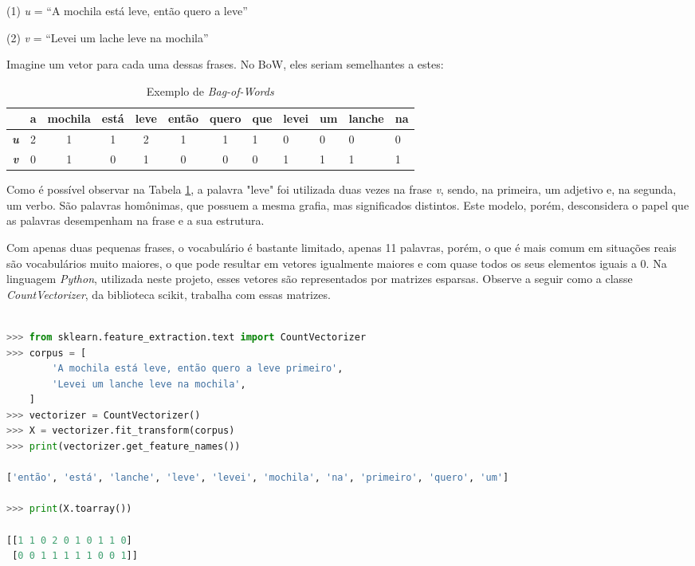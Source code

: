 \begin{samepage}
(1) \textit{u} =  “A mochila está leve, então quero a leve”

\nopagebreak

(2) \textit{v} = “Levei um lache leve na mochila”
\end{samepage}

Imagine um vetor para cada uma dessas frases. No BoW, eles seriam semelhantes a estes:

\begin{center}
\begin{table}[htbp]
\centering
\begin{tabular}{ccccccclllll}
\hline
 & \textbf{a} & \textbf{mochila} & \textbf{está} & \textbf{leve} & \textbf{então} & \textbf{quero} & \textbf{que} & \textbf{levei} & \textbf{um} & \textbf{lanche} & \textbf{na} \\ \hline
\textbf{\textit{u}} & 2 & 1 & 1 & 2 & 1 & 1 & 1 & 0 & 0 & 0 & 0 \\
\textbf{\textit{v}} & 0 & 1 & 0 & 1 & 0 & 0 & 0 & 1 & 1 & 1 & 1
\end{tabular}
\caption{Exemplo de \textit{Bag-of-Words}}
\label{bow}
\end{table}
\end{center}

Como é possível observar na Tabela \ref{bow}, a palavra "leve" foi utilizada duas vezes na frase \textit{v}, sendo, na primeira, um adjetivo e, na segunda, um verbo. São palavras homônimas, que possuem a mesma grafia, mas significados distintos. Este modelo, porém, desconsidera o papel que as palavras desempenham na frase e a sua estrutura.

Com apenas duas pequenas frases, o vocabulário é bastante limitado, apenas 11 palavras, porém, o que é mais comum em situações reais são vocabulários muito maiores, o que pode resultar em vetores igualmente maiores e com quase todos os seus elementos iguais a 0. Na linguagem \textit{Python}, utilizada neste projeto, esses vetores são representados por matrizes esparsas. Observe a seguir como a classe \textit{CountVectorizer}, da biblioteca scikit, trabalha com essas matrizes.

\begin{lstlisting}[language=python, caption=Matriz esparsa da classe csr\_matrix, label={lst:csr_matrix}]

>>> from sklearn.feature_extraction.text import CountVectorizer
>>> corpus = [
        'A mochila está leve, então quero a leve primeiro',
        'Levei um lanche leve na mochila',
    ]
>>> vectorizer = CountVectorizer()
>>> X = vectorizer.fit_transform(corpus)
>>> print(vectorizer.get_feature_names())

['então', 'está', 'lanche', 'leve', 'levei', 'mochila', 'na', 'primeiro', 'quero', 'um']

>>> print(X.toarray())

[[1 1 0 2 0 1 0 1 1 0]
 [0 0 1 1 1 1 1 0 0 1]]
 
\end{lstlisting}

